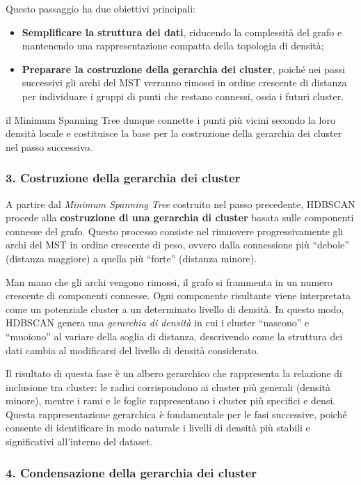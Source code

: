 Questo passaggio ha due obiettivi principali:
\begin{itemize}
    \item \textbf{Semplificare la struttura dei dati}, riducendo la complessità del grafo e mantenendo una rappresentazione compatta della topologia di densità;
    \item \textbf{Preparare la costruzione della gerarchia dei cluster}, poiché nei passi successivi gli archi del MST verranno rimossi in ordine crescente di distanza per individuare i gruppi di punti che restano connessi, ossia i futuri cluster.
\end{itemize}

il Minimum Spanning Tree dunque connette i punti più vicini secondo la loro densità locale e costituisce la base per la costruzione della gerarchia dei cluster nel passo successivo.

\subsubsection*{3. Costruzione della gerarchia dei cluster}

A partire dal \textit{Minimum Spanning Tree} costruito nel passo precedente, HDBSCAN procede alla \textbf{costruzione di una gerarchia di cluster} basata sulle componenti connesse del grafo. 
Questo processo consiste nel rimuovere progressivamente gli archi del MST in ordine crescente di peso, ovvero dalla connessione più ``debole'' (distanza maggiore) a quella più ``forte'' (distanza minore).

Man mano che gli archi vengono rimossi, il grafo si frammenta in un numero crescente di componenti connesse. 
Ogni componente risultante viene interpretata come un potenziale cluster a un determinato livello di densità. 
In questo modo, HDBSCAN genera una \textit{gerarchia di densità} in cui i cluster ``nascono'' e ``muoiono'' al variare della soglia di distanza, descrivendo come la struttura dei dati cambia al modificarsi del livello di densità considerato.

Il risultato di questa fase è un albero gerarchico che rappresenta la relazione di inclusione tra cluster: 
le radici corrispondono ai cluster più generali (densità minore), mentre i rami e le foglie rappresentano i cluster più specifici e densi. 
Questa rappresentazione gerarchica è fondamentale per le fasi successive, poiché consente di identificare in modo naturale i livelli di densità più stabili e significativi all'interno del dataset.

\subsubsection*{4. Condensazione della gerarchia dei cluster}

